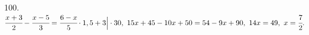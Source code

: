 100. $\cfrac{x+3}{2}-\cfrac{x-5}{3}=\cfrac{6-x}{5}\cdot1,5+3\Big|\cdot30,\ 15x+45-10x+50=54-9x+90,\ 14x=49,\ x=\cfrac{7}{2}.$\\
